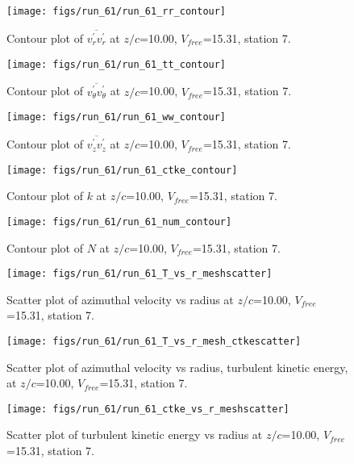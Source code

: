 \begin{figure}[H]
\centering
\texttt{[image: figs/run\_61/run\_61\_rr\_contour]}
\caption{Contour plot of $\overline{v_{r}^{\prime} v_{r}^{\prime}}$ at $z/c$=10.00, $V_{free}$=15.31, station 7.}
\end{figure}


\begin{figure}[H]
\centering
\texttt{[image: figs/run\_61/run\_61\_tt\_contour]}
\caption{Contour plot of $\overline{v_{\theta}^{\prime} v_{\theta}^{\prime}}$ at $z/c$=10.00, $V_{free}$=15.31, station 7.}
\end{figure}


\begin{figure}[H]
\centering
\texttt{[image: figs/run\_61/run\_61\_ww\_contour]}
\caption{Contour plot of $\overline{v_{z}^{\prime} v_{z}^{\prime}}$ at $z/c$=10.00, $V_{free}$=15.31, station 7.}
\end{figure}


\begin{figure}[H]
\centering
\texttt{[image: figs/run\_61/run\_61\_ctke\_contour]}
\caption{Contour plot of $k$ at $z/c$=10.00, $V_{free}$=15.31, station 7.}
\end{figure}


\begin{figure}[H]
\centering
\texttt{[image: figs/run\_61/run\_61\_num\_contour]}
\caption{Contour plot of $N$ at $z/c$=10.00, $V_{free}$=15.31, station 7.}
\end{figure}


\begin{figure}[H]
\centering
\texttt{[image: figs/run\_61/run\_61\_T\_vs\_r\_meshscatter]}
\caption{Scatter plot of azimuthal velocity vs radius at $z/c$=10.00, $V_{free}$=15.31, station 7.}
\end{figure}


\begin{figure}[H]
\centering
\texttt{[image: figs/run\_61/run\_61\_T\_vs\_r\_mesh\_ctkescatter]}
\caption{Scatter plot of azimuthal velocity vs radius, turbulent kinetic energy, at $z/c$=10.00, $V_{free}$=15.31, station 7.}
\end{figure}


\begin{figure}[H]
\centering
\texttt{[image: figs/run\_61/run\_61\_ctke\_vs\_r\_meshscatter]}
\caption{Scatter plot of turbulent kinetic energy vs radius at $z/c$=10.00, $V_{free}$=15.31, station 7.}
\end{figure}


